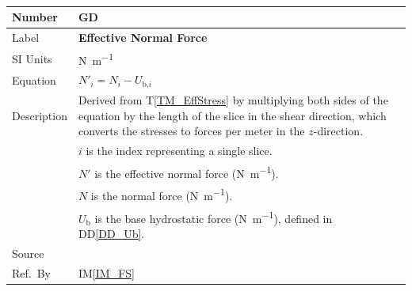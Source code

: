 \documentclass[12pt]{article}
\newcommand{\colAwidth}{0.13\textwidth}
\newcommand{\colBwidth}{0.82\textwidth}
\newcommand{\tref}[1]{T\ref{#1}}
\renewcommand{\arraystretch}{1}
\newcommand{\iref}[1]{IM\ref{#1}}
\newcommand{\ddref}[1]{DD\ref{#1}}
\newcounter{defnum} %
\begin{document}
~\newline

\noindent
\begin{minipage}{\textwidth}
	\renewcommand*{\arraystretch}{1.5}
	\begin{tabular}{| p{\colAwidth} | p{\colBwidth}|}
		
		\hline \rowcolor[gray]{0.9} Number&
		GD{defnum}\thedefnum \label{GD_EffNormal}\\
		
		\hline Label&\bf Effective Normal Force\\
		\hline SI Units & \si{\newton\per\meter}\\
		
		\hline Equation & \( N'_{i} = N_{i} - U_{\text{b,}i} \) \\
	
	\hline Description & Derived from \tref{TM_EffStress} by multiplying both 
	sides of the equation by the length of the slice in the shear direction, 
	which converts the stresses to forces per meter in the $z$-direction. 
	\\
	&$i$ is the index representing a single slice.\\
	&$N'$ is the effective normal force (\si{\newton\per\meter}).\\
	&$N$ is the normal force (\si{\newton\per\meter}).\\
	&$U_\text{b}$ is the base hydrostatic force (\si{\newton\per\meter}), 
	defined in \ddref{DD_Ub}.\\
	
	\hline Source & \cite{ZhuEtAl2005}\\
	
	\hline Ref.\ By & \iref{IM_FS} \\
	
	\hline
\end{tabular}
\end{minipage}\\

~\newline

\end{document}
